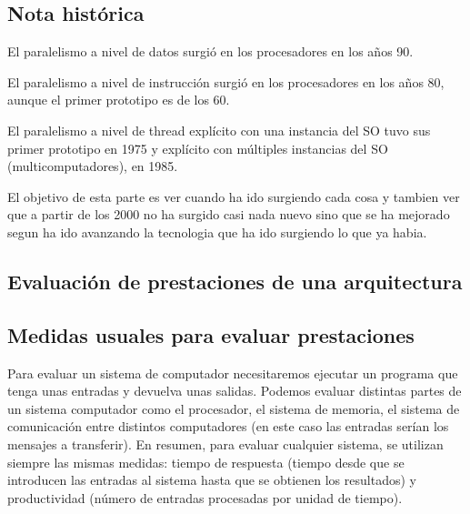 \documentclass[10pt,a4paper,spanish]{report}
\begin{document}
\begin{enumerate}[\color{azul}{\bf $\heartsuit$}]
\begin{enumerate}[$\longrightarrow$]
\end{enumerate}
\end{enumerate}

\textcolor[rgb]{0.2,0.4,0.8}{\subsection{Nota histórica}}
El paralelismo a nivel de datos surgió en los procesadores en los años 90.

El paralelismo a nivel de instrucción surgió en los procesadores en los años 80, aunque el primer prototipo es de los 60.

El paralelismo a nivel de thread explícito con una instancia del SO tuvo sus primer prototipo en 1975 y explícito con múltiples instancias del SO (multicomputadores), en 1985.

El objetivo de esta parte es ver cuando ha ido surgiendo cada cosa y tambien ver que a partir de los 2000 no ha surgido casi nada nuevo sino que se ha mejorado segun ha ido avanzando la tecnologia que ha ido surgiendo lo que ya habia.

\textcolor[rgb]{0.2,0.4,0.8}{\section{Evaluación de prestaciones de una arquitectura}}
\textcolor[rgb]{0.2,0.4,0.8}{\subsection{Medidas usuales para evaluar prestaciones}}
Para evaluar un sistema de computador necesitaremos ejecutar un programa que tenga unas entradas y devuelva unas salidas. Podemos evaluar distintas partes de un sistema computador como el procesador, el sistema de memoria, el sistema de comunicación entre distintos computadores (en este caso las entradas serían los mensajes a transferir). En resumen, para evaluar cualquier sistema, se utilizan siempre las mismas medidas: tiempo de respuesta (tiempo desde que se introducen las entradas al sistema hasta que se obtienen los resultados) y productividad (número de entradas procesadas por unidad de tiempo).
\end{document}
